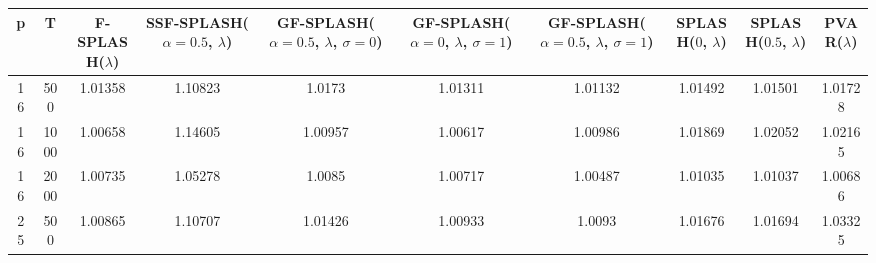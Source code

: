 \begin{tabular}{cccccccccc}
\hline
  p  &  T   &  F-SPLASH($\lambda$)  &  SSF-SPLASH($\alpha=0.5$, $\lambda$)  &  GF-SPLASH($\alpha=0.5$, $\lambda$, $\sigma=0$)  &  GF-SPLASH($\alpha=0$, $\lambda$, $\sigma=1$)  &  GF-SPLASH($\alpha=0.5$, $\lambda$, $\sigma=1$)  &  SPLASH($0$, $\lambda$)  &  SPLASH($0.5$, $\lambda$)  &  PVAR($\lambda$)  \\
\hline
 16  & 500  &        1.01358        &                1.10823                &                      1.0173                      &                    1.01311                     &                     1.01132                      &         1.01492          &          1.01501           &      1.01728      \\
 16  & 1000 &        1.00658        &                1.14605                &                     1.00957                      &                    1.00617                     &                     1.00986                      &         1.01869          &          1.02052           &      1.02165      \\
 16  & 2000 &        1.00735        &                1.05278                &                      1.0085                      &                    1.00717                     &                     1.00487                      &         1.01035          &          1.01037           &      1.00686      \\
 25  & 500  &        1.00865        &                1.10707                &                     1.01426                      &                    1.00933                     &                      1.0093                      &         1.01676          &          1.01694           &      1.03325      \\
\hline
\end{tabular}